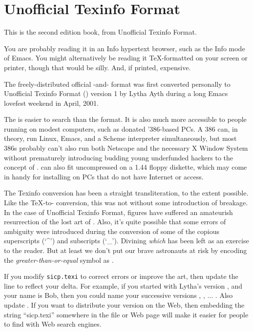 \chapter*{Unofficial Texinfo Format}
\label{UTF}

This is the second edition  book, from Unofficial Texinfo
Format.

You are probably reading it in an Info hypertext browser, such as the Info
mode of Emacs.  You might alternatively be reading it {\TeX}-formatted on your
screen or printer, though that would be silly.  And, if printed, expensive.

The freely-distributed official -and- format was
first converted personally to Unofficial Texinfo Format ()
version 1 by Lytha Ayth during a long Emacs lovefest weekend in April, 2001.

The  is easier to search than the  format.  It is
also much more accessible to people running on modest computers, such as
donated '386-based PCs.  A 386 can, in theory, run Linux, Emacs, and a Scheme
interpreter simultaneously, but most 386s probably can't also run both Netscape
and the necessary X Window System without prematurely introducing budding young
underfunded hackers to the concept of .   can also fit
uncompressed on a 1.44 floppy diskette, which may come in handy for
installing  on PCs that do not have Internet or  access.

The Texinfo conversion has been a straight transliteration, to the extent
possible.  Like the {\TeX}-to- conversion, this was not without
some introduction of breakage.  In the case of Unofficial Texinfo Format,
figures have suffered an amateurish resurrection of the lost art of
.  Also, it's quite possible that some errors of ambiguity
were introduced during the conversion of some of the copious superscripts (`\^{}')
and subscripts (`\_').  Divining \emph{which} has been left as an exercise to
the reader. But at least we don't put our brave astronauts at risk by encoding
the \emph{greater-than-or-equal} symbol as .

If you modify \texttt{sicp.texi} to correct errors or improve the
 art, then update the 
line to reflect your delta.  For example, if you started with Lytha's version
, and your name is Bob, then you could name your successive versions
, , \( \dots \) .  Also update
.  If you want to distribute your version on the Web, then
embedding the string ``sicp.texi'' somewhere in the file or Web page will make
it easier for people to find with Web search engines.

